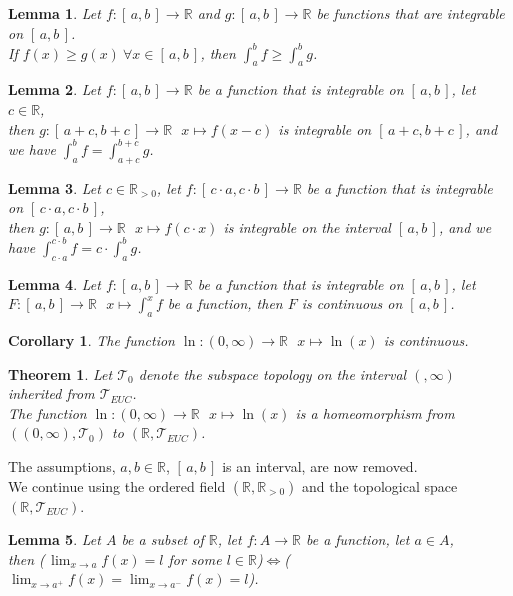 \documentclass[11pt]{article}
\theoremstyle{break}
\theoremstyle{break}
\newtheorem{thm}{Theorem}[section]
\newtheorem{lem}{Lemma}[thm]
\newtheorem{corL}{Corollary}[lem]
\newcommand{\R}{\mathbb{R}}
\newcommand{\T}{\mathcal{T}}
\newcommand{\Intab}{[\,a,b\,]}
\begin{document}
	\begin{lem}
		Let $f:\Intab \to \R$ and $g:\Intab \to \R$ be functions that are integrable on $\Intab$.\\ If $f(x) \geq g(x) \ \forall x \in \Intab$, then $\int_a^b f \geq \int_a^b g$.
	\end{lem}
	
	\begin{lem}
		Let $f:\Intab \to \R$ be a function that is integrable on $\Intab$, let $c \in \R$,\\ then $g:[\,a+c,b+c\,] \to \R \ \ \ x \mapsto f(x-c)$ is integrable on $[\,a+c,b+c\,]$, and we have $\int_a^b f = \int_{a+c}^{b+c} g$.
	\end{lem}
	
	\begin{lem}
		Let $c \in \R_{>0}$, let $f:[\,c \cdot a,c \cdot b\,] \to \R$ be a function that is integrable on $[\,c \cdot a,c \cdot b\,]$,\\ then $g:\Intab \to \R \ \ \ x \mapsto f(c \cdot x)$ is integrable on the interval $\Intab$, and we have $\int_{c \cdot a}^{c \cdot b} f = c \cdot \int_{a}^{b} g$.
	\end{lem}

	\begin{lem}
		Let $f:\Intab \to \R$ be a function that is integrable on $\Intab$, let $F:\Intab \to \R \ \ \ x \mapsto \int_a^x f$ be a function, then $F$ is continuous on $\Intab$.
	\end{lem}	 
	
	\begin{corL}
		The function $\ln:(0,\infty) \to \R \ \ \ x \mapsto \ln(x)$ is continuous.
	\end{corL}
	
	\begin{thm}
		Let $\T_{0}$ denote the subspace topology on the interval $(,\infty)$ inherited from $\T_{EUC}$.\\ The function $\ln:(0,\infty) \to \R \ \ \ x \mapsto \ln(x)$ is a homeomorphism from $((0,\infty),\T_{0})$ to $(\R,\T_{EUC})$.
	\end{thm}
	
	\color{red} \noindent The assumptions, $a,b \in \R$, $\Intab$ is an interval, are now removed. \\ We continue using the ordered field $(\R,\R_{>0})$ and the topological space $(\R,\T_{EUC})$. \color{black}
	\hfill\break
	\hfill\break
	
	\begin{lem}
		Let $A$ be a subset of $\R$, let $f:A \to \R$ be a function, let $a \in A$,\\  then (\,$\lim_{x \to a} f(x) =l$ for some $l \in \R$)$\iff$(\,$\lim_{x \to a^+} f(x) = \lim_{x \to a^-} f(x) = l$).
	\end{lem}	
	
\end{document}
